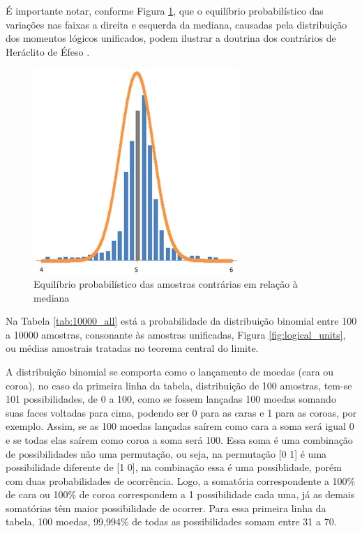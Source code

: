 É importante notar, conforme Figura \ref{fig:trend_chart_of_normal_distribution}, que o equilíbrio probabilístico das variações nas faixas a direita e esquerda da mediana, causadas pela distribuição dos momentos lógicos unificados, podem ilustrar a doutrina dos contrários de Heráclito de Éfeso \cite{brasilescola_heraclito}.
\begin{figure}[H]
\caption{Equilíbrio probabilístico das amostras contrárias em relação à mediana}
\label{fig:trend_chart_of_normal_distribution}
\centering
\includegraphics[scale=1.1]{sections/images/trend_chart_of_normal_distribution.jpg}
\end{figure}

Na Tabela \ref{tab:10000_all} está a probabilidade da distribuição binomial entre 100 a 10000 amostras, consonante às amostras unificadas, Figura \ref{fig:logical_units}, ou médias amostrais tratadas no teorema central do limite.

A distribuição binomial se comporta como o lançamento de moedas (cara ou coroa), no caso da primeira linha da tabela, distribuição de 100 amostras, tem-se 101 possibilidades, de 0 a 100, como se fossem lançadas 100 moedas somando suas faces voltadas para cima, podendo ser 0 para as caras e 1 para as coroas, por exemplo. Assim, se as 100 moedas lançadas saírem como cara a soma será igual 0 e se todas elas saírem como coroa a soma será 100. Essa soma é uma combinação de possibilidades não uma permutação, ou seja, na permutação [0 1] é uma possibilidade diferente de [1 0], na combinação essa é uma possiblidade, porém com duas probabilidades de ocorrência. Logo, a somatória correspondente a 100\% de cara ou 100\% de coroa correspondem a 1 possibilidade cada uma, já as demais somatórias têm maior possibilidade de ocorrer. Para essa primeira linha da tabela, 100 moedas, 99,994\% de todas as possibilidades somam entre 31 a 70. 

